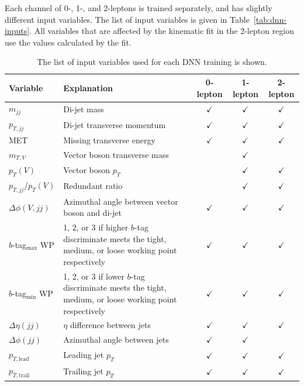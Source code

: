 Each channel of 0-, 1-, and 2-leptons is trained separately,
and has slightly different input variables.
The list of input variables is given in Table~\ref{tab:dnn-inputs}.
All variables that are affected by the kinematic fit in the 2-lepton region
use the values calculated by the fit.

\begin{table}
  \caption[Resolved DNN inputs]{
    The list of input variables used for each DNN training is shown.
  }
  \centering
  \begin{tabularx}{\textwidth}{|l|X|c|c|c|}
    \hline
    Variable & Explanation & 0-lepton & 1-lepton & 2-lepton \\
    \hline\hline
    $m_{jj}$ & Di-jet mass & $\checkmark$ & $\checkmark$ & $\checkmark$ \\
    $p_{T,jj}$ & Di-jet transverse momentum & $\checkmark$ & $\checkmark$ & $\checkmark$ \\
    MET & Missing transverse energy & $\checkmark$ & $\checkmark$ & $\checkmark$ \\
    \hline
    $m_{T,V}$ & Vector boson transverse mass & & $\checkmark$ & \\
    $p_T(V)$ & Vector boson $p_T$ & & $\checkmark$ & $\checkmark$ \\
    $p_{T,jj}/p_T(V)$ & Redundant ratio & & $\checkmark$ & $\checkmark$ \\
    \hline
    $\Delta\phi(V, jj)$ & Azimuthal angle between vector boson and di-jet & $\checkmark$ & $\checkmark$ & $\checkmark$ \\
    $b$-tag$_\mathrm{max}$ WP & 1, 2, or 3 if higher $b$-tag discriminate meets the tight, medium, or loose working point respectively & $\checkmark$ & $\checkmark$ & $\checkmark$ \\
    $b$-tag$_\mathrm{min}$ WP & 1, 2, or 3 if lower $b$-tag discriminate meets the tight, medium, or loose working point respectively & $\checkmark$ & $\checkmark$ & $\checkmark$ \\
    \hline
    $\Delta\eta(jj)$ & $\eta$ difference between jets & $\checkmark$ & $\checkmark$ & $\checkmark$ \\
    $\Delta\phi(jj)$ & Azimuthal angle between jets & $\checkmark$ & $\checkmark$ & \\
    $p_{T, \mathrm{lead}}$ & Leading jet $p_T$ & $\checkmark$ & $\checkmark$ & $\checkmark$ \\
    \hline
    $p_{T, \mathrm{trail}}$ & Trailing jet $p_T$ & $\checkmark$ & $\checkmark$ & $\checkmark$ \\

\end{tabularx}
\end{table}
